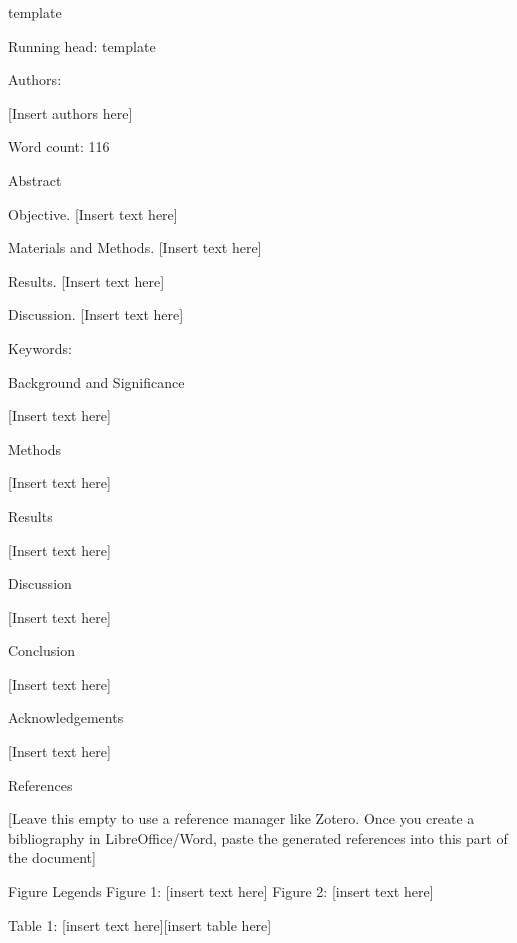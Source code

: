 


template

Running head:
template

Authors:

[Insert authors here]

Word count: 116

\pagebreak 

Abstract

Objective. [Insert text here]

Materials and Methods. [Insert text here]

Results. [Insert text here]

Discussion. [Insert text here]

Keywords: 

\pagebreak 

Background and Significance

[Insert text here]

\pagebreak 

Methods

[Insert text here]

\pagebreak 

Results

[Insert text here]

\pagebreak 

Discussion

[Insert text here]

Conclusion

[Insert text here]

\pagebreak 

Acknowledgements

[Insert text here]

\pagebreak 

References

[Leave this empty to use a reference manager like Zotero. Once you create a bibliography in LibreOffice\slash Word, paste the generated references into this part of the document]

\pagebreak 

Figure Legends
Figure 1: [insert text here]
Figure 2: [insert text here]

\pagebreak 

Table 1: [insert text here][insert table here]

\pagebreak 





